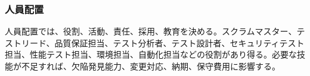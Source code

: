 \subsubsection{人員配置}
人員配置では、役割、活動、責任、採用、教育を決める。スクラムマスター、テストリード、品質保証担当、テスト分析者、テスト設計者、セキュリティテスト担当、性能テスト担当、環境担当、自動化担当などの役割があり得る。必要な技能が不足すれば、欠陥発見能力、変更対応、納期、保守費用に影響する。
